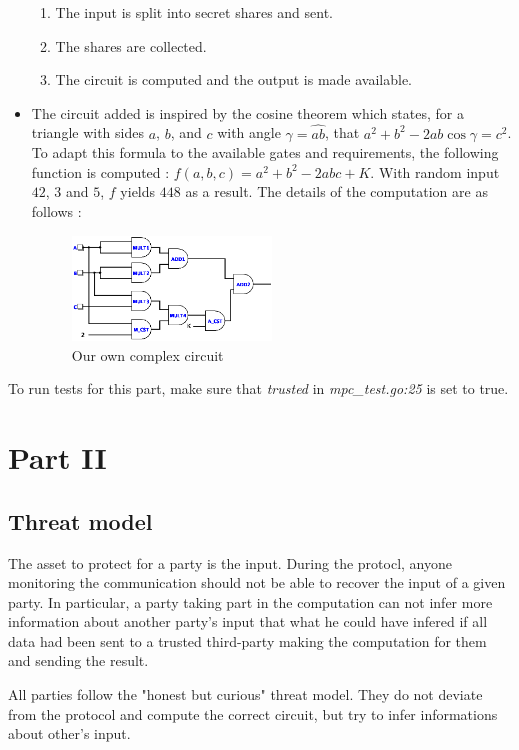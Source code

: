 \documentclass[10pt,conference]{IEEEtran}
\begin{document}
\begin{itemize}
\begin{enumerate}
            \item The input is split into secret shares and sent.
            \item The shares are collected.
            \item The circuit is computed and the output is made available.
        \end{enumerate}
    \item The circuit added is inspired by the cosine theorem which states, for a triangle with sides $a$, $b$, and $c$ with angle $\gamma = \widehat{ab}$, that $a^2 + b^2 - 2ab\cos\gamma = c^2$. To adapt this formula to the available gates and requirements, the following function is computed : $f(a,b,c) = a^2 + b^2 - 2abc + K$. With random input $42$, $3$ and $5$, $f$ yields $448$ as a result. The details of the computation are as follows :
      \begin{figure}[h]
        \caption{Our own complex circuit}
        \includegraphics[width=0.5\textwidth]{main.png}
      \end{figure}
\end{itemize}
To run tests for this part, make sure that \textit{trusted} in \textit{mpc\_test.go:25} is set to true.

\section{Part II}
\subsection{Threat model}
The asset to protect for a party is the input. During the protocl, anyone monitoring the communication should not be able to recover the input of a given party. In particular, a party taking part in the computation can not infer more information about another party's input that what he could have infered if all data had been sent to a trusted third-party making the computation for them and sending the result.

All parties follow the "honest but curious" threat model. They do not deviate from the protocol and compute the correct circuit, but try to infer informations about other's input.
\end{document}
